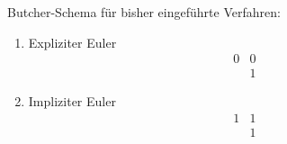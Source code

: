 \begin{example}
	Butcher-Schema für bisher eingeführte Verfahren:
	
	\begin{enumerate}
		\item Expliziter Euler
				$$\begin{array}{cc}
			0 & 0\\
			  & 1
		\end{array}$$

		\item Impliziter Euler
				$$\begin{array}{cc}
			1 & 1\\
			  & 1
		\end{array}$$
		
	\end{enumerate}
\end{example}
